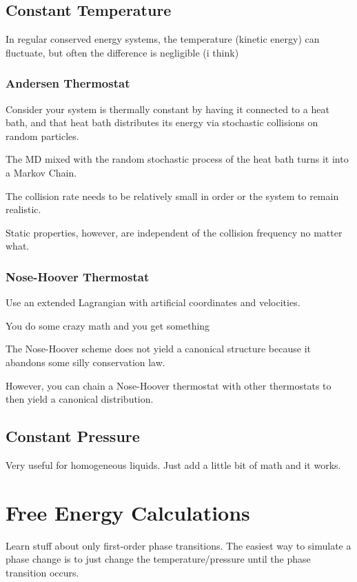 \documentclass[fleqn]{report}
\begin{document}
\section{Constant Temperature}
In regular conserved energy systems, the temperature (kinetic energy) 
can fluctuate, but often the difference is negligible (i think)

\subsection{Andersen Thermostat}
Consider your system is thermally constant by having it connected to a heat bath, 
and that heat bath distributes its energy via stochastic collisions 
on random particles. 

The MD mixed with the random stochastic process of the heat bath turns it 
into a Markov Chain. 

The collision rate needs to be relatively small in order or the 
system to remain realistic. 

Static properties, however, are independent of the collision frequency 
no matter what. 

\subsection{Nose-Hoover Thermostat}
Use an extended Lagrangian with artificial coordinates and velocities. 

You do some crazy math and you get something 

The Nose-Hoover scheme does not yield a canonical structure because it 
abandons some silly conservation law. 

However, you can chain a Nose-Hoover thermostat with other thermostats 
to then yield a canonical distribution. 

\section{Constant Pressure}
Very useful for homogeneous liquids. Just add a little 
bit of math and it works. 

\chapter{Free Energy Calculations}
Learn stuff about only first-order phase transitions. 
The easiest way to simulate a phase change is to just change the 
temperature/pressure until the phase transition occurs. 
\end{document}
